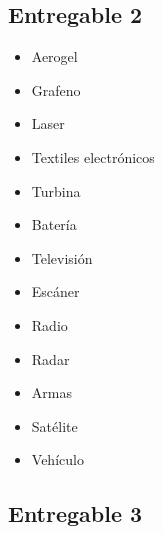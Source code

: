 


\subsection{Entregable 2}

\begin{itemize}
    \item Aerogel
    \item Grafeno
    \item Laser
    \item Textiles electrónicos
    \item Turbina
    \item Batería
    \item Televisión
    \item Escáner
    \item Radio
    \item Radar
    \item Armas
    \item Satélite
    \item Vehículo %
\end{itemize}


\subsection{Entregable 3}


